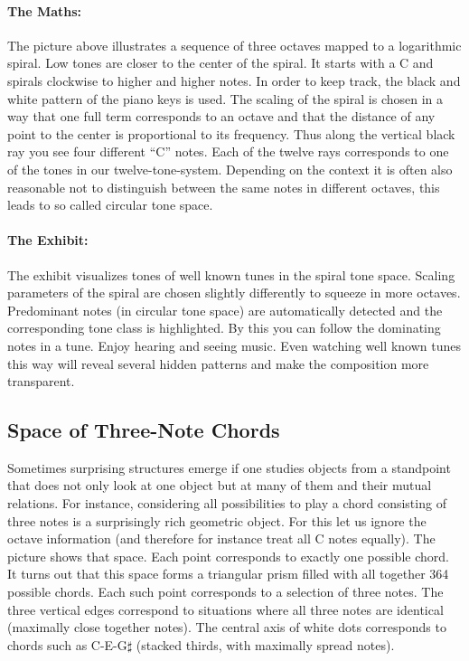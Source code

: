 \paragraph{The Maths:} The picture above illustrates a sequence of three octaves mapped to a logarithmic spiral. Low tones are closer to the center of the spiral. It starts with a C and spirals clockwise to higher and higher notes. In order to keep track, the black and white pattern of the piano keys is used. The scaling of the spiral is chosen in a way that one full term corresponds to an octave and that the distance of any point to the center is proportional to its frequency. Thus along the vertical black ray you see four different ``C'' notes. Each of the twelve rays corresponds to one of the tones in our twelve-tone-system. Depending on the context it is often also reasonable not to distinguish between the same notes in different octaves, this leads to so called circular tone space.

\paragraph{The Exhibit:} The exhibit visualizes tones of well known tunes in the spiral tone space. Scaling parameters of the spiral are chosen slightly differently to squeeze in more octaves. Predominant notes (in circular tone space) are automatically detected and the corresponding tone class is highlighted. By this you can follow the dominating notes in a tune. Enjoy hearing and seeing music. Even watching well known tunes this way will reveal several hidden patterns and make the composition more transparent.

\subsection{Space of Three-Note Chords}
Sometimes surprising structures emerge if one studies objects from a standpoint that does not only look at one object but at many of them and their mutual relations. For instance, considering all possibilities to play a chord consisting of three notes is a surprisingly rich geometric object. For this let us ignore the octave information (and therefore for instance treat all C notes equally). The picture shows that space. Each point corresponds to exactly one possible chord. It turns out that this space forms a triangular prism filled with all together 364 possible chords. Each such point corresponds to a selection of three notes. The three vertical edges correspond to situations where all three notes are identical (maximally close together notes). The central axis of white dots corresponds to chords such as C-E-G$\sharp$ (stacked thirds, with maximally spread notes).

